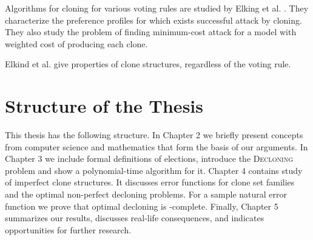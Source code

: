 Algorithms for cloning for various voting rules are studied by Elking et al. \cite{cloninginelections}.
They characterize the preference profiles for which exists successful attack by cloning.
They also study the problem of finding minimum-cost attack for a model with weighted cost of producing each clone.

Elkind et al. \cite{clonestructures} give properties of clone structures, regardless of the voting rule.


\section{Structure of the Thesis}

This thesis has the following structure.
In Chapter 2 we briefly present concepts from computer science
and mathematics that form the basis of our arguments.
In Chapter 3 we include formal definitions of elections, introduce the \textsc{Decloning} problem
and show a polynomial-time algorithm for it.
Chapter 4 contains study of imperfect clone structures.
It discusses error functions for clone set families and the optimal non-perfect decloning problems.
For a sample natural error function we prove that optimal decloning is \np-complete.
Finally, Chapter 5 summarizes our results, discusses real-life consequences,
and indicates opportunities for further research.
